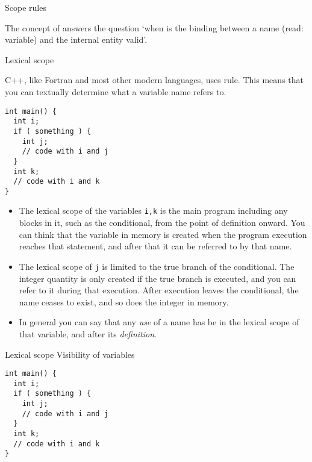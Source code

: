 
 {Scope rules}

The concept of  answers the question `when is the
binding between a name (read: variable) and the internal entity valid'.

 {Lexical scope}

C++, like Fortran and most other modern languages, uses
 rule. This means that you can textually
determine what a variable name refers to.
\begin{lstlisting}
int main() {
  int i;
  if ( something ) {
    int j;
    // code with i and j
  }
  int k;
  // code with i and k
}
\end{lstlisting}
\begin{itemize}
\item The lexical scope of the variables \lstinline{i,k} is the main program
  including any blocks in it, such as the conditional, from the point
  of definition onward. You can think that the variable in memory is
  created when the program execution reaches that statement, and after
  that it can be referred to by that name.
\item The lexical scope of \lstinline{j} is limited to the true branch of the
  conditional. The integer quantity is only created if the true branch
  is executed, and you can refer to it during that execution. After
  execution leaves the conditional, the name ceases to exist, and so
  does the integer in memory.
\item In general you can say that any
  \emph{use}
  of a name has be in the lexical scope of that variable, and after
  its \emph{definition}.
\end{itemize}

\begin{slide}{Lexical scope}
  \label{sl:lexical}
  Visibility of variables
\begin{lstlisting}
int main() {
  int i;
  if ( something ) {
    int j;
    // code with i and j
  }
  int k;
  // code with i and k
}
\end{lstlisting}  
\end{slide}

